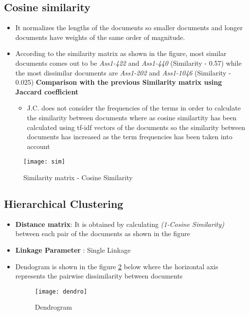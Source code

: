 \documentclass[7pt,a4paper]{article}
\begin{document}
\subsection{Cosine similarity}
\begin{itemize}
\item{It normalizes the lengths of the documents so smaller documents and longer documents have weights of the same order of magnitude.}
\item{According to the similarity matrix as shown in the figure, most similar documents comes out to be \textit{Ass1-422} and \textit{Ass1-440} (Similarity - 0.57) while the most dissimilar documents are \textit{Ass1-202} and \textit{Ass1-1046} (Similarity - 0.025)}
\textbf{Comparison with the previous Similarity matrix using Jaccard coefficient}
\begin{itemize}
\item{J.C. does not consider the frequencies of the terms in order to calculate the similarity between documents where as cosine similartity has been calculated using tf-idf vectors of the documents so the similarity between documents has increased as the term frequencies has been taken into account}
\end{itemize}
\end{itemize}
\begin{figure}[h]
\centering
\texttt{[image: sim]}
\caption{Similarity matrix - Cosine Similarity}
\label{image-Cos}
\end{figure}

\subsection{Hierarchical Clustering}
\begin{itemize}
\item{\textbf{Distance matrix}: It is obtained by calculating \textit{(1-Cosine Similarity)} between each pair of the documents as shown in the figure}
\item{\textbf{Linkage Parameter} : Single Linkage}
\item{Dendogram is shown in the figure \ref{image-Dendogram} below where the horizontal axis represents the pairwise dissimilarity between documents}

\begin{figure}[h]
\centering
\texttt{[image: dendro]}
\caption{Dendrogram}
\label{image-Dendogram}
\end{figure}


\end{itemize}
\end{document}
